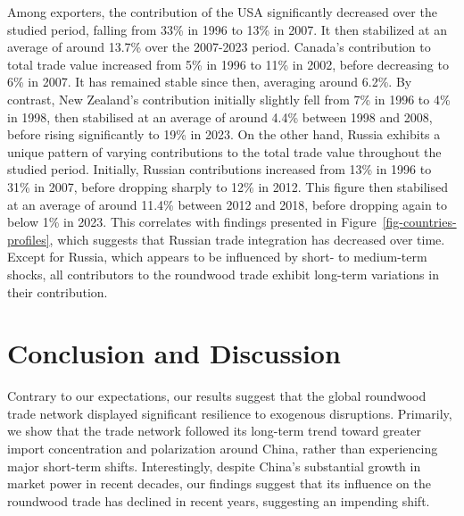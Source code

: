 \documentclass[
  authoryear,
  review,
  3p]{elsarticle}
\begin{document}
Among exporters, the contribution of the USA significantly decreased
over the studied period, falling from 33\% in 1996 to 13\% in 2007. It
then stabilized at an average of around 13.7\% over the 2007-2023
period. Canada's contribution to total trade value increased from 5\% in
1996 to 11\% in 2002, before decreasing to 6\% in 2007. It has remained
stable since then, averaging around 6.2\%. By contrast, New Zealand's
contribution initially slightly fell from 7\% in 1996 to 4\% in 1998,
then stabilised at an average of around 4.4\% between 1998 and 2008,
before rising significantly to 19\% in 2023. On the other hand, Russia
exhibits a unique pattern of varying contributions to the total trade
value throughout the studied period. Initially, Russian contributions
increased from 13\% in 1996 to 31\% in 2007, before dropping sharply to
12\% in 2012. This figure then stabilised at an average of around 11.4\%
between 2012 and 2018, before dropping again to below 1\% in 2023. This
correlates with findings presented in
Figure~\ref{fig-countries-profiles}, which suggests that Russian trade
integration has decreased over time. Except for Russia, which appears to
be influenced by short- to medium-term shocks, all contributors to the
roundwood trade exhibit long-term variations in their contribution.

\section{Conclusion and Discussion}\label{conclusion-and-discussion}

Contrary to our expectations, our results suggest that the global
roundwood trade network displayed significant resilience to exogenous
disruptions. Primarily, we show that the trade network followed its
long-term trend toward greater import concentration and polarization
around China, rather than experiencing major short-term shifts.
Interestingly, despite China's substantial growth in market power in
recent decades, our findings suggest that its influence on the roundwood
trade has declined in recent years, suggesting an impending shift.
\end{document}
